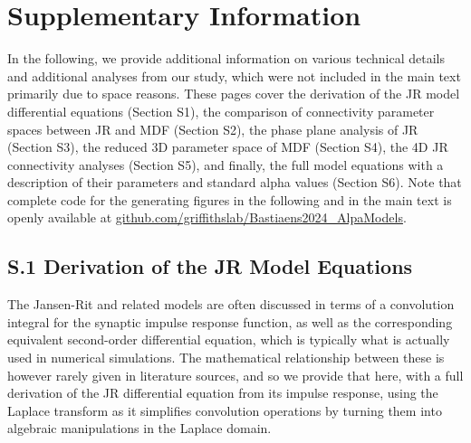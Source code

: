 \documentclass[12pt,twoside]{article}
\begin{document}







\newpage
\section*{Supplementary Information}

In the following, we provide additional information on various technical details and additional analyses from our study, which were not included in the main text primarily due to space reasons. These pages cover the derivation of the JR model differential equations (Section S1), the comparison of connectivity parameter spaces between JR and MDF (Section S2), the phase plane analysis of JR (Section S3), the reduced 3D parameter space of MDF (Section S4), the 4D JR connectivity analyses (Section S5), and finally, the full model equations with a description of their parameters and standard alpha values (Section S6).
Note that complete code for the generating figures in the following and in the main text is openly available at \url{github.com/griffithslab/Bastiaens2024_AlpaModels}.


\newpage
\subsection*{S.1 Derivation of the JR Model Equations}

The Jansen-Rit and related models are often discussed in terms of a convolution integral for the synaptic impulse response function, as well as the corresponding equivalent second-order differential equation, which is typically what is actually used in numerical simulations. The mathematical relationship between these is however rarely given in literature sources, and so we provide that here, with a full derivation of the JR differential equation from its impulse response, using the Laplace transform as it simplifies convolution operations by turning them into algebraic manipulations in the Laplace domain.
\end{document}
